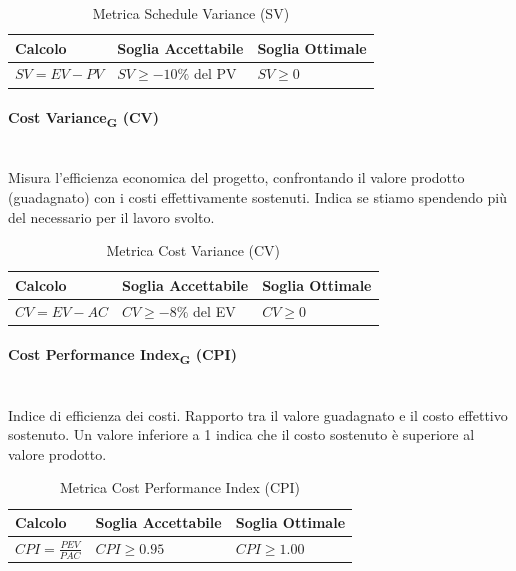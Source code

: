 \documentclass[11pt,a4paper]{article}
\begin{document}
\begin{table}[H]
    \centering
    \renewcommand{\arraystretch}{1.5} %
    \begin{tabular}{|M{0.4\textwidth}|M{0.25\textwidth}|M{0.25\textwidth}|}
        \hline
        \textbf{Calcolo} & \textbf{Soglia Accettabile} & \textbf{Soglia Ottimale} \\
        \hline
        $SV = EV - PV$ & $SV \ge -10\%$ del PV & $SV \ge 0$ \\
        \hline
    \end{tabular}
    \caption{Metrica Schedule Variance (SV)}
\end{table}

\paragraph{Cost Variance\textsubscript{G} (CV)} \hfill \\
Misura l'efficienza economica del progetto, confrontando il valore prodotto (guadagnato) con i costi effettivamente sostenuti. Indica se stiamo spendendo più del necessario per il lavoro svolto.

\begin{table}[H]
    \centering
    \renewcommand{\arraystretch}{1.5} %
    \begin{tabular}{|M{0.4\textwidth}|M{0.25\textwidth}|M{0.25\textwidth}|}
        \hline
        \textbf{Calcolo} & \textbf{Soglia Accettabile} & \textbf{Soglia Ottimale} \\
        \hline
        $CV = EV - AC$ & $CV \ge -8\%$ del EV & $CV \ge 0$ \\
        \hline
    \end{tabular}
    \caption{Metrica Cost Variance (CV)}
\end{table}

\paragraph{Cost Performance Index\textsubscript{G} (CPI)} \hfill \\
Indice di efficienza dei costi. Rapporto tra il valore guadagnato e il costo effettivo sostenuto. Un valore inferiore a 1 indica che il costo sostenuto è superiore al valore prodotto.

\begin{table}[H]
    \centering
    \renewcommand{\arraystretch}{1.5}
    \begin{tabular}{|M{0.4\textwidth}|M{0.25\textwidth}|M{0.25\textwidth}|}
        \hline
        \textbf{Calcolo} & \textbf{Soglia Accettabile} & \textbf{Soglia Ottimale} \\
        \hline
        $CPI = \frac{PEV}{PAC}$ & $CPI \ge 0.95$ & $CPI \ge 1.00$ \\
        \hline
    \end{tabular}
    \caption{Metrica Cost Performance Index (CPI)}
\end{table}
\end{document}
